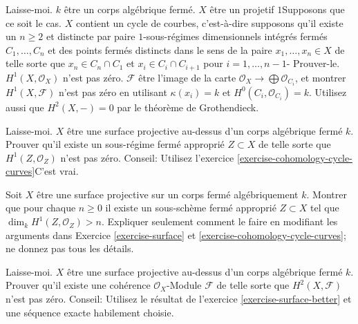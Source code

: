 \begin{exercise}
\label{exercise-cohomology-cycle-curves}
Laisse-moi. $k$ être un corps algébrique fermé.
$X$ être un projetif $1$Supposons que ce soit le
cas. $X$ contient un cycle de courbes, c'est-à-dire supposons qu'il
existe un $n \geq 2$ et distincte par paire
$1$-sous-régimes dimensionnels intégrés fermés $C_1, \ldots, C_n$
et des points fermés distincts dans le sens de la
paire $x_1, \ldots, x_n \in X$ de telle sorte que
$x_n \in C_n \cap C_1$ et
$x_i \in C_i \cap C_{i
+ 1}$ pour $i = 1, \ldots, n
- 1$- Prouver-le. $H^1(X, \mathcal{O}_X)$ n'est pas zéro. $\mathcal{F}$
être l'image de la carte $\mathcal{O}_X \to \bigoplus
\mathcal{O}_{C_i}$, et montrer $H^1(X, \mathcal{F})$ n'est pas zéro
en utilisant $\kappa(x_i) = k$ et $H^0(C_i, \mathcal{O}_{C_i}) = k$. Utilisez aussi
que $H^2(X, -) = 0$ par le théorème de Grothendieck.
\end{exercise}

\begin{exercise}
\label{exercise-surface}
Laisse-moi. $X$ être une surface projective au-dessus d'un corps algébrique fermé
$k$. Prouver qu'il existe un sous-régime fermé approprié $Z \subset X$
de telle sorte que $H^1(Z, \mathcal{O}_Z)$ n'est
pas zéro. Conseil: Utilisez l'exercice \ref{exercise-cohomology-cycle-curves}C'est vrai.
\end{exercise}

\begin{exercise}
\label{exercise-surface-better}
Soit $X$ être une surface projective sur un corps fermé algébriquement
$k$. Montrer que pour chaque
$n \geq 0$ il existe un sous-schème fermé approprié
$Z \subset X$ tel que $\dim_k
H^1(Z, \mathcal{O}_Z) > n$. Expliquer seulement comment le
faire en modifiant les arguments dans
Exercice \ref{exercise-surface} et \ref{exercise-cohomology-cycle-curves}; ne donnez pas tous les détails.
\end{exercise}

\begin{exercise}
\label{exercise-surface-h2-nonzero}
Laisse-moi. $X$ être une surface projective au-dessus d'un corps algébrique
fermé $k$. Prouver qu'il existe une cohérence $\mathcal{O}_X$-Module $\mathcal{F}$ de
telle sorte que $H^2(X, \mathcal{F})$ n'est pas zéro. Conseil: Utilisez
le résultat de l'exercice \ref{exercise-surface-better} et une séquence exacte
habilement choisie.
\end{exercise}

